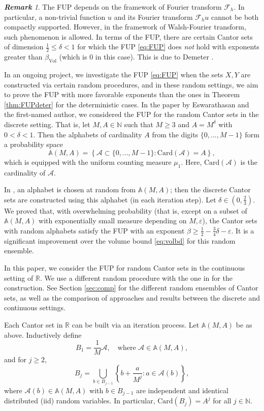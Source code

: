 \documentclass[12pt,reqno]{amsart}
\newcommand\Ab{\mathbb{A}}
\newcommand\Ac{\mathcal{A}}
\newcommand\Card{\mathrm{Card}}
\newcommand\Fc{\mathcal{F}}
\newcommand\N{\mathbb{N}}
\newcommand\R{\mathbb{R}}
\newcommand\Vol{\mathrm{Vol}}
\newcommand\ve{\varepsilon}
\theoremstyle{plain}
\theoremstyle{remark}
\newtheorem*{rmk}{\textbf{Remark}}
\numberwithin{equation}{section}
\begin{document}
\begin{rmk}
The FUP depends on the framework of Fourier transform $\Fc_h$. In particular, a non-trivial function $u$ and its Fourier transform $\Fc_h u$ cannot be both compactly supported. However, in the framework of Walsh-Fourier transform, such phenomenon is allowed. In terms of the FUP, there are certain Cantor sets of dimension $\frac12\le\delta<1$ for which the FUP \eqref{eq:FUP} does \textit{not} hold with exponents greater than $\beta_\Vol$ (which is $0$ in this case). This is due to Demeter \cite{De}.
\end{rmk}

In an ongoing project, we investigate the FUP \eqref{eq:FUP} when the sets $X,Y$ are constructed via certain random procedures, and in these random settings, we aim to prove the FUP with more favorable exponents than the ones in Theorem \ref{thm:FUPdeter} for the deterministic cases. In the paper \cite{EH} by Eswarathasan and the first-named author, we considered the FUP for the random Cantor sets in the discrete setting. That is, let $M,A\in\N$ such that $M\ge3$ and $A=M^\delta$ with $0<\delta<1$. Then the alphabets of cardinality $A$ from the digits $\{0,...,M-1\}$ form a probability space 
$$\Ab(M,A)=\left\{\Ac\subset\{0,...,M-1\}:\Card(\Ac)=A\right\},$$
which is equipped with the uniform counting measure $\mu_1$. Here, $\Card(\Ac)$ is the cardinality of $\Ac$.  

In \cite{EH}, an alphabet is chosen at random from $\Ab(M,A)$; then the discrete Cantor sets are constructed using this alphabet (in each iteration step). Let $\delta\in(0,\frac23)$. We proved that, with overwhelming probability (that is, except on a subset of $\Ab(M,A)$ with exponentially small measure depending on $M,\ve$), the Cantor sets with random alphabets satisfy the FUP with an exponent $\beta\ge\frac12-\frac34\delta-\ve$. It is a significant improvement over the volume bound \eqref{eq:volbd} for this random ensemble.

In this paper, we consider the FUP for random Cantor sets in the continuous setting of $\R$. We use a different random procedure with the one in \cite{EH} for the construction. See Section \ref{sec:comp} for the different random ensembles of Cantor sets, as well as the comparison of approaches and results between the discrete and continuous settings.

Each Cantor set in $\R$ can be built via an iteration process. Let $\Ab(M,A)$ be as above. Inductively define 
$$B_1=\frac1M\Ac,\quad\text{where }\Ac\in\Ab(M,A),$$
and for $j\ge2$,
$$B_j=\bigcup_{b\in B_{j-1}}\left\{b+\frac{a}{M^j}:a\in\Ac(b)\right\},$$
where $\Ac(b)\in\Ab(M,A)$ with $b\in B_{j-1}$ are independent and identical distributed (iid) random variables. In particular, $\Card(B_j)=A^j$ for all $j\in\N$.
\end{document}
